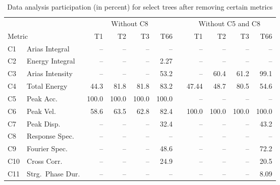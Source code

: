 
\begin{table*}[t]
	\centering
	\caption{Data analysis participation (in percent) for select trees after removing certain metrics}
	\label{tab:participation-extra}
	\small
	\begin{tabular}{llrrrrcrrrr}
	& & \multicolumn{4}{c}{Without C8}		& 	& \multicolumn{4}{c}{Without C5 and C8}\\
	\cline{3-6} \cline{8-11}
	\multicolumn{2}{l}{Metric} 	& T1 	& T2	& T3 	& T66 	&	& T1 	& T2	& T3 	& T66 	\\ 
	\hline
	C1 		& Arias Integral	& --	& --	& -- 	& --	&	& --	& --	& -- 	& --	\\
	C2 		& Energy Integral	& --	& --	& -- 	& 2.27	&	& --	& --	& -- 	& --	\\
	C3 		& Arias Intensity	& --	& --	& -- 	& 53.2	&	& --	& 60.4	& 61.2	& 99.1	\\
	C4 		& Total Energy		& 44.3	& 81.8	& 81.8	& 83.2	&	& 47.44	& 48.7	& 80.5	& 54.6	\\
	C5 		& Peak Acc.			& 100.0	& 100.0	& 100.0	& 100.0	&	& --	& --	& -- 	& --	\\
	C6 		& Peak Vel.			& 58.6	& 63.5	& 62.8	& 82.4	&	& 100.0	& 100.0	& 100.0	& 100.0	\\
	C7 		& Peak Disp.		& --	& --	& -- 	& 32.4	&	& --	& --	& -- 	& 43.2	\\
	C8 		& Response Spec.	& --	& --	& -- 	& --	&	& --	& --	& -- 	& --	\\
	C9 		& Fourier Spec.		& --	& --	& -- 	& 48.6	&	& --	& --	& -- 	& 72.2	\\
	C10		& Cross Corr.		& --	& --	& -- 	& 24.9	&	& --	& --	& -- 	& 20.5	\\
	C11		& Strg.~Phase Dur.	& --	& --	& -- 	& --	&	& --	& --	& -- 	& 8.09	\\
	\hline
	\end{tabular}
\end{table*}


